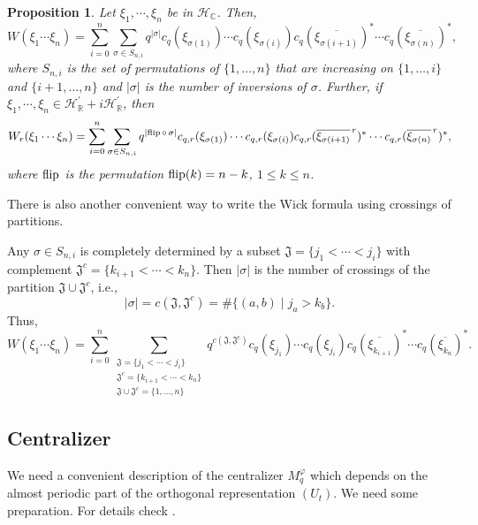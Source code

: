 \documentclass[12pt, a4paper,reqno]{amsart}
\newtheorem{Proposition}[Theorem]{Proposition}
\theoremstyle{definition}
\renewcommand{\leq}{\leqslant}
\def\C{\mathbb C}
\def\R{\mathbb R}
\newcommand{\CH}{\mathcal{H}}
\newcommand{\abs}[1]{\left\vert#1\right\vert}
\begin{document}
\begin{Proposition}\label{wick}
Let $\xi_1,\cdots,\xi_n$ be in $\CH_\C$. Then,
$$W(\xi_1\cdots \xi_n)=\sum_{i=0}^n \sum_{\sigma\in S_{n,i}} q^{\abs{\sigma}}c_q(\xi_{\sigma(1)})\cdots
c_q(\xi_{\sigma(i)})c_q(\overline{\xi_{\sigma(i+1)}})^*\cdots
c_q(\overline{\xi_{\sigma(n)}})^*,$$
where $S_{n,i}$ is the set of permutations of $\{1,\ldots,n\}$ that are increasing on $\{1,\ldots,i\}$ and $\{i+1,\ldots,n\}$ and $|\sigma|$ is the number of inversions of $\sigma$. Further, if $\xi_1,\cdots,\xi_n\in\CH_\R^\prime + i\CH_\R^\prime$, then 
$$W_r(\xi_1\cdots \xi_n)=\sum_{i=0}^n \sum_{\sigma\in S_{n,i}} q^{\abs{{\rm flip\,}\circ\,\sigma}}c_{q,r}(\xi_{\sigma(1)})\cdots
c_{q,r}(\xi_{\sigma(i)})c_{q,r}(\overline{\xi_{\sigma(i+1)}}^{\,r})^*\cdots c_{q,r}(\overline{\xi_{\sigma(n)}}^{\,r})^*,$$
where ${\rm flip}$ is the permutation ${\rm flip}(k)=n-k$, $1\leq k\leq n$.
\end{Proposition}

There is also another convenient way to write the Wick formula using crossings of partitions.

Any $\sigma\in S_{n,i}$ is completely determined by a subset $\mathfrak{J}=\{j_1<\cdots<j_i\}$ with complement $\mathfrak{J}^c=\{k_{i+1}<\cdots<k_n\}$. Then $\abs{\sigma}$ is the number of crossings of the partition $\mathfrak{J}\cup \mathfrak{J}^c$, i.e., 
$$\abs{\sigma}=c(\mathfrak{J},\mathfrak{J}^c)=\#\{(a,b) \;|\; j_a>k_b\}.$$ 
Thus,
\begin{equation}\label{wick'}
W(\xi_1\cdots \xi_n)=\sum_{i=0}^n 
\sum_{\substack{\mathfrak{J}=\{j_1<\cdots<j_i\}\\ \mathfrak{J}^c=\{k_{i+1}<\cdots<k_n\}\\ \mathfrak{J}\cup \mathfrak{J}^c=\{1,...,n\}}}
 q^{c(\mathfrak{J},\mathfrak{J}^c)}c_q(\xi_{j_1})\cdots c_q(\xi_{j_i})c_q(\overline{\xi_{k_{i+1}}})^*\cdots
c_q(\overline{\xi_{k_n}})^*.
\end{equation}



\subsection{Centralizer}\label{SectionCentralizer}

We need a convenient description of the centralizer $M_q^\varphi$ which depends on the almost periodic part of the orthogonal representation $(U_t)$. We need some preparation. For details check \cite{bik-kunal}. 
\end{document}
